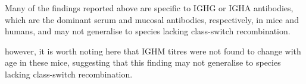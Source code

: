 Many of the findings reported above are specific to IGHG or IGHA antibodies, which are the dominant serum and mucosal antibodies, respectively, in mice and humans, and may not generalise to species lacking class-switch recombination.

however, it is worth noting here that IGHM titres were not found to change with age in these mice, suggesting that this finding may not generalise to species lacking class-switch recombination. \parencite{speziali2009specific}





